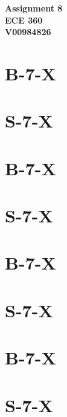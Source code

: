 \documentclass{article}
\begin{document}
\begin{center}
    \textbf{\LARGE Assignment 8} \\[1ex]
    \textbf{ECE 360} \\[1ex]
    \textbf{V00984826} \\[2ex]
\end{center}


\section*{B-7-X}
\section*{S-7-X}
\section*{B-7-X}
\section*{S-7-X}
\section*{B-7-X}
\section*{S-7-X}
\section*{B-7-X}
\section*{S-7-X}
\end{document}
